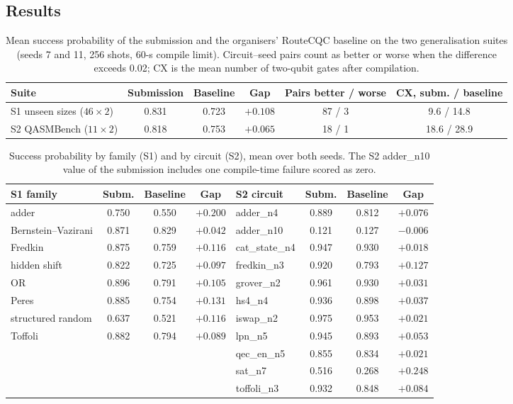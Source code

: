 \subsection{Results}

\begin{table}[htbp]\centering\small\setlength{\tabcolsep}{4.5pt}
\caption{Mean success probability of the submission and the organisers' RouteCQC baseline on the two generalisation suites (seeds 7 and 11, 256 shots, 60-s compile limit). Circuit--seed pairs count as better or worse when the difference exceeds 0.02; CX is the mean number of two-qubit gates after compilation.}\label{tab:lxb-e1}
\begin{tabular}{lccccc}\toprule
Suite & Submission & Baseline & Gap & Pairs better / worse & CX, subm. / baseline\\\midrule
S1 unseen sizes ($46\times2$) & 0.831 & 0.723 & $+0.108$ & 87 / 3 & 9.6 / 14.8\\
S2 QASMBench ($11\times2$) & 0.818 & 0.753 & $+0.065$ & 18 / 1 & 18.6 / 28.9\\\bottomrule
\end{tabular}
\end{table}

\begin{table}[htbp]\centering\small\setlength{\tabcolsep}{4pt}
\caption{Success probability by family (S1) and by circuit (S2), mean over both seeds. The S2 adder\_n10 value of the submission includes one compile-time failure scored as zero.}\label{tab:lxb-e1b}
\begin{tabular}{lccc@{\hspace{2.2em}}lccc}\toprule
S1 family & Subm. & Baseline & Gap & S2 circuit & Subm. & Baseline & Gap\\\midrule
adder & 0.750 & 0.550 & $+0.200$ & adder\_n4 & 0.889 & 0.812 & $+0.076$\\
Bernstein--Vazirani & 0.871 & 0.829 & $+0.042$ & adder\_n10 & 0.121 & 0.127 & $-0.006$\\
Fredkin & 0.875 & 0.759 & $+0.116$ & cat\_state\_n4 & 0.947 & 0.930 & $+0.018$\\
hidden shift & 0.822 & 0.725 & $+0.097$ & fredkin\_n3 & 0.920 & 0.793 & $+0.127$\\
OR & 0.896 & 0.791 & $+0.105$ & grover\_n2 & 0.961 & 0.930 & $+0.031$\\
Peres & 0.885 & 0.754 & $+0.131$ & hs4\_n4 & 0.936 & 0.898 & $+0.037$\\
structured random & 0.637 & 0.521 & $+0.116$ & iswap\_n2 & 0.975 & 0.953 & $+0.021$\\
Toffoli & 0.882 & 0.794 & $+0.089$ & lpn\_n5 & 0.945 & 0.893 & $+0.053$\\
 & & & & qec\_en\_n5 & 0.855 & 0.834 & $+0.021$\\
 & & & & sat\_n7 & 0.516 & 0.268 & $+0.248$\\
 & & & & toffoli\_n3 & 0.932 & 0.848 & $+0.084$\\\bottomrule
\end{tabular}
\end{table}

